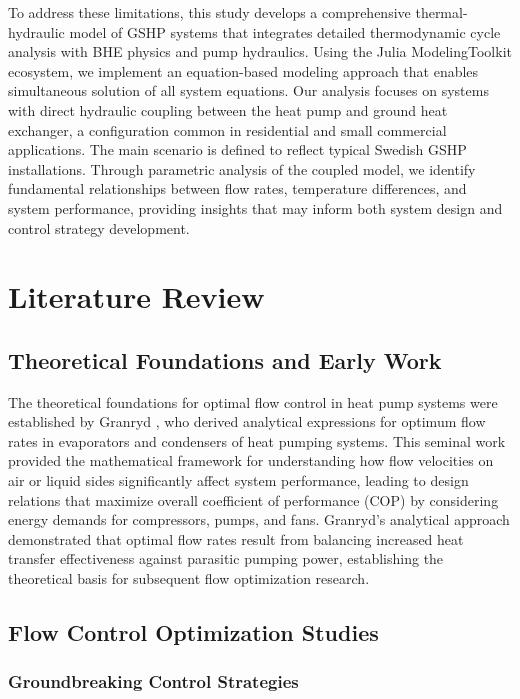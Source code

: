 \documentclass[journal=iecr,manuscript=]{achemso}
\begin{document}
To address these limitations, this study develops a comprehensive
thermal-hydraulic model of GSHP systems that integrates detailed
thermodynamic cycle analysis with BHE physics and pump hydraulics. Using
the Julia ModelingToolkit ecosystem, we implement an equation-based
modeling approach that enables simultaneous solution of all system
equations. Our analysis focuses on systems with direct hydraulic
coupling between the heat pump and ground heat exchanger, a
configuration common in residential and small commercial applications.
The main scenario is defined to reflect typical Swedish GSHP
installations. Through parametric analysis of the coupled model, we
identify fundamental relationships between flow rates, temperature
differences, and system performance, providing insights that may inform
both system design and control strategy development.

\section{Literature Review}\label{literature-review}

\subsection{Theoretical Foundations and Early
Work}\label{theoretical-foundations-and-early-work}

The theoretical foundations for optimal flow control in heat pump
systems were established by Granryd \citep{granryd2010analytical}, who
derived analytical expressions for optimum flow rates in evaporators and
condensers of heat pumping systems. This seminal work provided the
mathematical framework for understanding how flow velocities on air or
liquid sides significantly affect system performance, leading to design
relations that maximize overall coefficient of performance
(\(\text{COP}\)) by considering energy demands for compressors, pumps,
and fans. Granryd's analytical approach demonstrated that optimal flow
rates result from balancing increased heat transfer effectiveness
against parasitic pumping power, establishing the theoretical basis for
subsequent flow optimization research.

\subsection{Flow Control Optimization
Studies}\label{flow-control-optimization-studies}

\subsubsection{Groundbreaking Control
Strategies}\label{groundbreaking-control-strategies}
\end{document}
